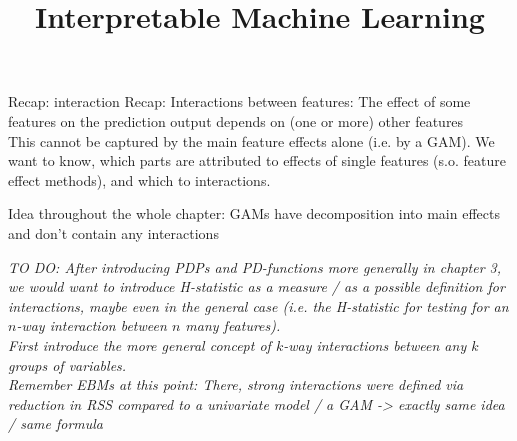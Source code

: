 \documentclass[11pt,compress,t,notes=noshow, aspectratio=169, xcolor=table]{beamer}
\title{Interpretable Machine Learning}
\date{}
\begin{document}

\newcommand{\titlefigure}{figure/25-05-31_Hooker_2004_graph_fANOVA}
\newcommand{\learninggoals}{
\item Basic idea of additive functional decompositions
\item Motivation and usefulness of functional decompositions
\item Difficulty of obtaining or even defining a functional decomposition}



\begin{frame}{Recap: interaction}
    Recap: Interactions between features: The effect of some features on the prediction output depends on (one or more) other features \\
    This cannot be captured by the main feature effects alone (i.e. by a GAM).
    We want to know, which parts are attributed to effects of single features (s.o. feature effect methods), and which to interactions.

    Idea throughout the whole chapter: GAMs have decomposition into main effects and don't contain any interactions

    \textit{
    TO DO: After introducing PDPs and PD-functions more generally in chapter 3, we would want to introduce H-statistic as a measure / as a possible definition for interactions, maybe even in the general case (i.e. the H-statistic for testing for an \(n\)-way interaction between \(n\) many features). \\
    First introduce the more general concept of \(k\)-way interactions between any \(k\) groups of variables. \\
    Remember EBMs at this point: There, strong interactions were defined via reduction in RSS compared to a univariate model / a GAM -> exactly same idea / same formula
    }

\end{frame}
\end{document}
